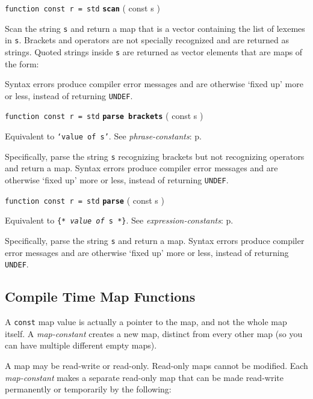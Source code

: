 \documentclass[12pt]{article}
\newcommand{\ttkey}[1]{{\tt \bfseries #1}}
\newcommand{\pagref}[1]{p\pageref{#1}}
\newenvironment{indpar}[1][0.3in]%
	{\begin{list}{}%
		     {\setlength{\itemsep}{0in}%
		      \setlength{\topsep}{0in}%
		      \setlength{\parsep}{1ex}%
		      \setlength{\labelwidth}{#1}%
		      \setlength{\leftmargin}{#1}%
		      \addtolength{\leftmargin}{\labelsep}}%
	 \item}%
	{\end{list}}
\begin{document}
{\tt function const r = std} \ttkey{scan} ( const s  )
\begin{indpar}
Scan the string {\tt s} and return a map that is a vector
containing the list of lexemes in {\tt s}.  Brackets and
operators are not specially recognized and are returned
as strings.  Quoted strings inside {\tt s} are returned
as vector elements that are maps of the form: \\

Syntax errors produce compiler error messages and are
otherwise `fixed up' more or less, instead of returning {\tt UNDEF}.
\end{indpar}

{\tt function const r = std} \ttkey{parse brackets} ( const s  )
\begin{indpar}
Equivalent to {\tt `{\rm \em value of} s'}.
See {\em phrase-constants}: \pagref{PHRASE-CONSTANT}.

Specifically, parse the string {\tt s} recognizing brackets
but not recognizing operators and return a map.
Syntax errors produce compiler error messages and are
otherwise `fixed up' more or less, instead of returning {\tt UNDEF}.
\end{indpar}

{\tt function const r = std} \ttkey{parse} ( const s  )
\begin{indpar}
Equivalent to {\tt \{* {\rm \em value of} s *\}}.
See {\em expression-constants}: \pagref{EXPRESSION-CONSTANT}.

Specifically, parse the string {\tt s} and return a map.
Syntax errors produce compiler error messages and are
otherwise `fixed up' more or less, instead of returning {\tt UNDEF}.
\end{indpar}

\subsection{Compile Time Map Functions}

A {\tt const} map value is actually a pointer to the map,
and not the whole map itself.
A {\em map-constant} creates a new map, distinct from every
other map (so you can have multiple different empty maps).

A map may be read-write or read-only.\label{READ-ONLY-MAP}
Read-only maps cannot
be modified.  Each {\em map-constant} makes a separate read-only
map that can be made read-write permanently or temporarily by
the following:
\end{document}
